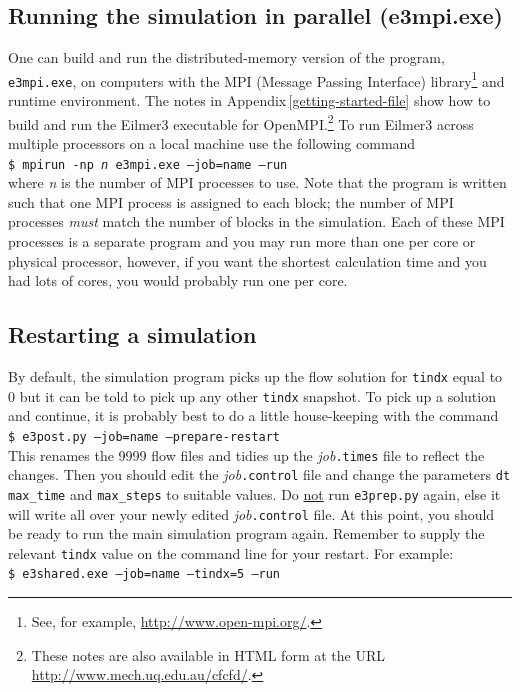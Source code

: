 \documentclass[12pt,a4paper,twoside]{article}
\begin{document}
\subsection{Running the simulation in parallel (e3mpi.exe)}
%
One can build and run the distributed-memory version of the program, 
\texttt{e3mpi.exe}, on computers with 
the MPI (Message Passing Interface) library\footnote{See, for example, \url{http://www.open-mpi.org/}.} 
and runtime environment.
The notes in Appendix\,\ref{getting-started-file} show how to build and run 
the Eilmer3 executable for OpenMPI.\footnote{These notes are also available in HTML form at the URL
\url{http://www.mech.uq.edu.au/cfcfd/}.}
To run Eilmer3 across multiple processors
on a local machine use the following command\\
\texttt{\$ mpirun -np \textit{n} e3mpi.exe --job=name --run}\\
where \textit{n} is the number of MPI processes to use.
Note that the program is written such that one MPI process is assigned to each block; 
the number of MPI processes \emph{must} match the number of blocks in the simulation.
Each of these MPI processes is a separate program and you may run more than one per core 
or physical processor, however, if you want the shortest calculation time and you had lots of cores,
you would probably run one per core.

\subsection{Restarting a simulation}
%
By default, the simulation program picks up the flow solution for \texttt{tindx} equal to 0 but
it can be told to pick up any other \texttt{tindx} snapshot.
To pick up a solution and continue, it is probably best to do a little house-keeping with the command\\
\texttt{\$ e3post.py --job=name --prepare-restart}\\
This renames the 9999 flow files and tidies up the \textit{job}\texttt{.times} file to reflect the changes.
Then you should edit the \textit{job}\texttt{.control} file and change the parameters \texttt{dt}
\texttt{max\_time} and \texttt{max\_steps} to suitable values.
Do \underline{not} run \texttt{e3prep.py} again, else it will write all over 
your newly edited \textit{job}\texttt{.control} file.
At this point, you should be ready to run the main simulation program again.
Remember to supply the relevant \texttt{tindx} value on the command line for your restart.
For example:\\
\texttt{\$ e3shared.exe --job=name --tindx=5 --run}
\end{document}
